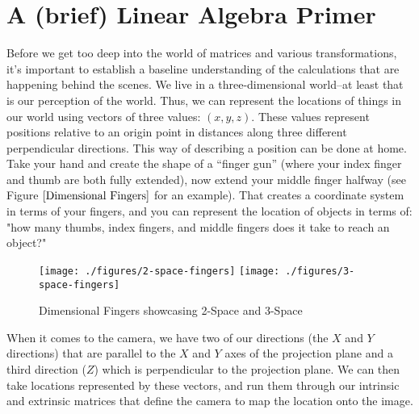 \documentclass[
    12pt,
    twoside,
    bibstyle=chicago,
    headerstyle=uppercase,
	bibfile=thesis.bib
]{reedthesis}
\begin{document}
\section{A (brief) Linear Algebra Primer}
Before we get too deep into the world of matrices and various transformations, it's important to establish a baseline understanding of the calculations that are happening behind the scenes. We live in a three-dimensional world--at least that is our perception of the world. Thus, we can represent the locations of things in our world using vectors of three values: $(x, y, z)$. These values represent positions relative to an origin point in distances along three different perpendicular directions. This way of describing a position can be done at home. Take your hand and create the shape of a “finger gun” (where your index finger and thumb are both fully extended), now extend your middle finger halfway (see Figure $\ref{Dimensional Fingers}$ for an example). That creates a coordinate system in terms of your fingers, and you can represent the location of objects in terms of: "how many thumbs, index fingers, and middle fingers does it take to reach an object?" 

\begin{figure}[b]
	   
	       \centering
	    
	    \texttt{[image: ./figures/2-space-fingers]} 
		\hfill	    
	    \texttt{[image: ./figures/3-space-fingers]}
	     \caption{Dimensional Fingers showcasing 2-Space and 3-Space}
	 \label{Dimensional Fingers}
	\end{figure}

When it comes to the camera, we have two of our directions (the $X$ and $Y$ directions) that are parallel to the $X$ and $Y$ axes of the projection plane and a third direction ($Z$) which is perpendicular to the projection plane. We can then take locations represented by these vectors, and run them through our intrinsic and extrinsic matrices that define the camera to map the location onto the image.
\end{document}
